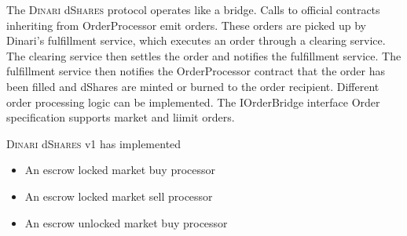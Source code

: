 \documentclass[sigconf,nonacm,prologue,table]{acmart}
\numberwithin{equation}{section}
\theoremstyle{definition}
\theoremstyle{remark}
\newcommand{\dshares}{\textsc{Dinari} d\textsc{Shares} }
\begin{document}
The \dshares protocol operates like a bridge. Calls to official contracts inheriting from OrderProcessor emit orders. These orders are picked up by Dinari's fulfillment service, which executes an order through a clearing service. The clearing service then settles the order and notifies the fulfillment service. The fulfillment service then notifies the OrderProcessor contract that the order has been filled and dShares are minted or burned to the order recipient. Different order processing logic can be implemented. The IOrderBridge interface Order specification supports market and liimit orders.

\dshares v1 has implemented
\begin{itemize}
    \item An escrow locked market buy processor
    \item An escrow locked market sell processor
    \item An escrow unlocked market buy processor
\end{itemize}

  
\end{document}
